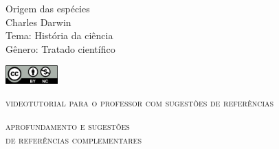 \documentclass[smaller,professionalfonts,15pt]{beamer}
\begin{document}
										\begin{frame}\begin{raggedleft}
										\Huge 
Origem das espécies						\\
										\huge 
Charles Darwin							\\
										\bigskip
										\normalsize
Tema: História da ciência				\\	
Gênero: Tratado científico				\\\vfill\hfill
\publishername

										\end{raggedleft}

\smallskip\includegraphics[width=2cm]{ccbync.png}\hfill
\end{frame}


\begin{frame}{\textsc{videotutorial para o professor com sugestões de referências}}
\vspace{-2cm}\begin{figure}
\end{figure}
\end{frame}



\begin{frame}
\hfill\Huge
\textsc{aprofundamento e sugestões\\\hfill de referências complementares}
\end{frame}
\end{document}
